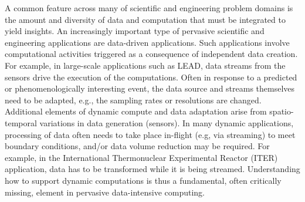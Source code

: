 \documentclass[12pt]{article}
\begin{document}
A common feature across many of scientific and engineering problem
domains is the amount and diversity of data and computation that must
be integrated to yield insights. %
An increasingly important type of pervasive scientific and engineering
applications are data-driven applications. Such applications involve
computational activities triggered as a consequence of independent
data creation. For example, in large-scale applications such as LEAD,
data streams from the sensors drive the execution of the
computations. Often in response to a predicted or phenomenologically
interesting event, the data source and streams themselves need to be
adapted, e.g., the sampling rates or resolutions are
changed. Additional elements of dynamic compute and data adaptation
arise from spatio-temporal variations in data generation (sensors). In
many dynamic applications, processing of data often needs to take
place in-flight (e.g, via streaming) to meet boundary conditions,
and/or data volume reduction may be required. For example, in the
International Thermonuclear Experimental Reactor (ITER) application,
data has to be transformed while it is being streamed. Understanding
how to support dynamic computations is thus a fundamental, often
critically missing, element in pervasive data-intensive computing.
\end{document}

